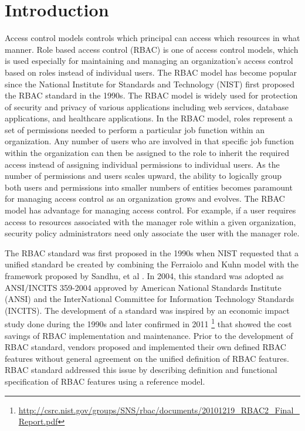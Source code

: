 \section{Introduction} \label{sec:introduction}

Access control models controls which principal can access which resources in what manner.
Role based access control (RBAC) is one of access control models, which is used especially for maintaining and managing an organization's access control based on roles instead of individual users. The RBAC model has become popular since the National Institute for Standards and Technology (NIST) first proposed the RBAC standard in the 1990s. The RBAC model is widely used for protection of security and privacy of various applications including web services, database applications, and healthcare applications. 
In the RBAC model, roles represent a set of permissions needed to perform a particular job function within an organization.  
Any number of users who are involved in that specific job function within the organization can then be assigned to the role to inherit the required access instead of assigning individual permissions to individual users. 
As the number of permissions and users scales upward, the ability to logically group both users and permissions into smaller numbers of entities becomes paramount for managing access control as an organization grows and evolves. The RBAC model has advantage for managing access control. For example, if a user requires access to resources associated with the manager role within a given organization, security policy administrators need only associate the user with the manager role.

The RBAC standard was first proposed in the 1990s when NIST 
requested that a unified standard be created by combining the Ferraiolo and Kuhn model \cite{ferraiolokuhn} with the framework 
proposed by Sandhu, et al \cite{sandhu1996role}.  
In 2004, this standard was adopted as ANSI/INCITS 359-2004 approved by American National Standards Institute (ANSI) and the InterNational Committee for Information Technology Standards (INCITS). 
The development of a standard was inspired by an economic impact study done during the 1990s and later confirmed in 2011 \footnote{\url{http://csrc.nist.gov/groups/SNS/rbac/documents/20101219_RBAC2_Final_Report.pdf}} that showed the cost savings of RBAC implementation and maintenance. Prior to the development of RBAC standard, vendors proposed and implemented their own defined RBAC features without general agreement on the unified definition of RBAC features. RBAC standard addressed this issue by describing definition and functional specification of RBAC features using a reference model.

